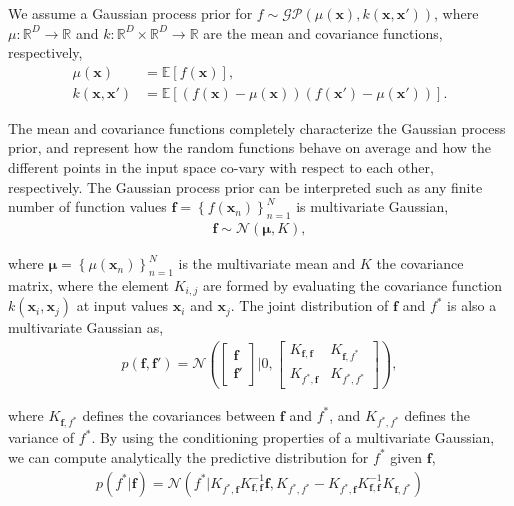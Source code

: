 \documentclass[]{interact}
\theoremstyle{plain}%
\theoremstyle{definition}
\theoremstyle{remark}
\begin{document}
We assume a Gaussian process prior for $f \sim \mathcal{GP}(\mu(\mathbf{x}), k(\mathbf{x}, \mathbf{x}'))$, where $\mu: \mathbb{R}^D \rightarrow \mathbb{R}$ and $k: \mathbb{R}^D \times \mathbb{R}^D \rightarrow \mathbb{R}$ are the mean and covariance functions, respectively,
%
\begin{align*}
 	\mu(\mathbf{x}) &= \mathbb{E}\!\left[f(\mathbf{x})\right],\\ 
 	k(\mathbf{x}, \mathbf{x}') &= \mathbb{E}\!\left[\left( f(\mathbf{x}) - \mu(\mathbf{x}) \right)\left( f(\mathbf{x}') - \mu(\mathbf{x}') \right)\right].
\end{align*} 

The mean and covariance functions completely characterize the Gaussian process prior, and represent how the random functions behave on average and how the different points in the input space co-vary with respect to each other, respectively. The Gaussian process prior can be interpreted such as any finite number of function values $\mathbf{f}=\left\lbrace f(\mathbf{x}_n) \right\rbrace_{n=1}^N$ is multivariate Gaussian, 
\begin{align*}
\mathbf{f} \sim \mathcal{N}(\boldsymbol{\mu},K),
\end{align*}

\noindent where $\boldsymbol{\mu} = \left\lbrace \mu(\mathbf{x}_n) \right\rbrace_{n=1}^N$ is the multivariate mean and $K$ the covariance matrix, where the element $K_{i,j}$ are formed by evaluating the covariance function $k(\mathbf{x}_i,\mathbf{x}_j)$ at input values $\mathbf{x}_i$ and $\mathbf{x}_j$. The joint distribution of $\mathbf{f}$ and $f^*$ is also a multivariate Gaussian as,
%
\begin{eqnarray*}
p(\mathbf{f},\mathbf{f}')=\mathcal{N} \left( \left[ \begin{array}{cc}
\mathbf{f} \\ 
\mathbf{f}'
\end{array} \right] | 0,\left[ \begin{array}{cc}
K_{\mathbf{f},\mathbf{f}} & K_{\mathbf{f},f^*} \\ 
K_{f^*,\mathbf{f}} & K_{f^*,f^*}
\end{array} \right] \right),
\end{eqnarray*} 

\noindent where $K_{\mathbf{f},f^*}$ defines the covariances between $\mathbf{f}$ and $f^*$, and $K_{f^*,f^*}$ defines the variance of $f^*$. By using the conditioning properties of a multivariate Gaussian, we can compute analytically the predictive distribution for $f^*$  given $\mathbf{f}$,
\begin{align*}
	p(f^*| \mathbf{f}) = \mathcal{N}(f^*| K_{f^*,\mathbf{f}} K_{\mathbf{f},\mathbf{f}}^{-1} \mathbf{f},  K_{f^*,f^*}-K_{f^*,\mathbf{f}} K_{\mathbf{f},\mathbf{f}}^{-1} K_{\mathbf{f},f^*}  )
\end{align*}
\end{document}
